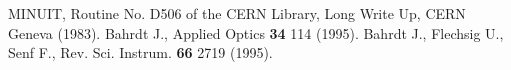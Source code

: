 



 MINUIT, Routine No. D506 of the CERN Library, Long Write Up,
CERN Geneva (1983).
 Bahrdt J., Applied Optics \textbf{34} 114 (1995). 
 Bahrdt J., Flechsig U., Senf F., Rev. Sci. Instrum. 
\textbf{66} 2719 (1995). 

